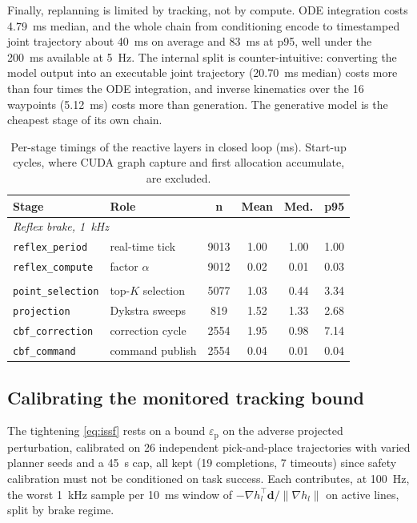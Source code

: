 \documentclass[journal]{IEEEtran}
\begin{document}
Finally, replanning is limited by tracking, not by compute. ODE integration costs 4.79~ms median, and the whole chain from conditioning encode to timestamped joint trajectory about 40~ms on average and 83~ms at p95, well under the 200~ms available at 5~Hz. The internal split is counter-intuitive: converting the model output into an executable joint trajectory (20.70~ms median) costs more than four times the ODE integration, and inverse kinematics over the 16 waypoints (5.12~ms) costs more than generation. The generative model is the cheapest stage of its own chain.

\begin{table}[t]
\caption{Per-stage timings of the reactive layers in closed loop (ms). Start-up cycles, where CUDA graph capture and first allocation accumulate, are excluded.}
\label{tab:timing}
\centering
\footnotesize
\setlength{\tabcolsep}{4pt}
\begin{tabular}{llcccc}
\toprule
\textbf{Stage} & \textbf{Role} & \textbf{n} & \textbf{Mean} & \textbf{Med.} & \textbf{p95}\\
\midrule
\multicolumn{6}{l}{\textit{Reflex brake, 1~kHz}}\\
\texttt{reflex\_period} & real-time tick & 9013 & 1.00 & 1.00 & 1.00\\
\texttt{reflex\_compute} & factor $\alpha$ & 9012 & 0.02 & 0.01 & 0.03\\
\addlinespace
\multicolumn{6}{l}{\textit{SDF-CBF shield, 100~Hz}}\\
\texttt{point\_selection} & top-$K$ selection & 5077 & 1.03 & 0.44 & 3.34\\
\texttt{projection} & Dykstra sweeps & 819 & 1.52 & 1.33 & 2.68\\
\texttt{cbf\_correction} & correction cycle & 2554 & 1.95 & 0.98 & 7.14\\
\texttt{cbf\_command} & command publish & 2554 & 0.04 & 0.01 & 0.04\\
\bottomrule
\end{tabular}
\end{table}

\subsection{Calibrating the monitored tracking bound}\label{subsec:res_eps}

The tightening \eqref{eq:issf} rests on a bound $\varepsilon_{\mathrm{p}}$ on the adverse projected perturbation, calibrated on 26 independent pick-and-place trajectories with varied planner seeds and a 45~s cap, all kept (19 completions, 7 timeouts) since safety calibration must not be conditioned on task success. Each contributes, at 100~Hz, the worst 1~kHz sample per 10~ms window of $-\nabla h_l^{\top}\mathbf{d}/\|\nabla h_l\|$ on active lines, split by brake regime.
\end{document}
